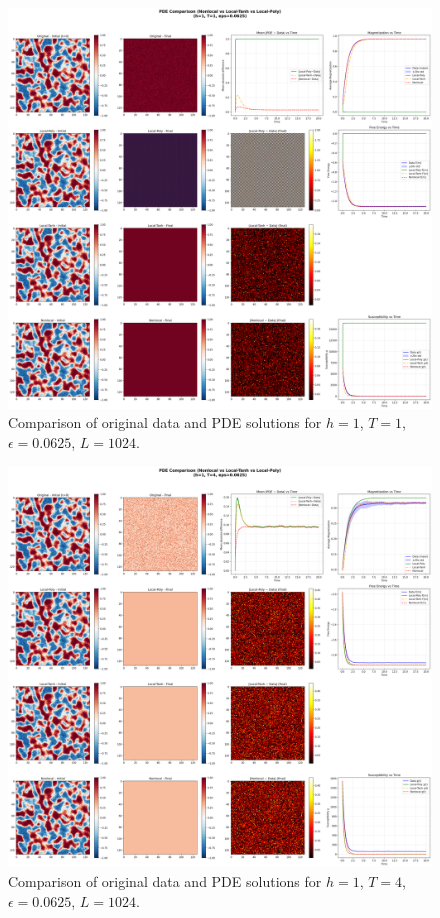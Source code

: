 \documentclass[11pt,a4paper]{article}
\begin{document}
\begin{figure}[!h]
    \centering
    \includegraphics[width=1.0\textwidth]{fig/compare_pde_solvers_L1024_h1_T1_eps0.0625.png}
    \caption{Comparison of original data and PDE solutions for $h=1$, $T=1$, $\epsilon=0.0625$, $L=1024$.}
    \label{fig:pde_comparison_h1_T1_eps0.0625}
\end{figure}

\begin{figure}[!h]
    \centering
    \includegraphics[width=1.0\textwidth]{fig/compare_pde_solvers_L1024_h1_T4_eps0.0625.png}
    \caption{Comparison of original data and PDE solutions for $h=1$, $T=4$, $\epsilon=0.0625$, $L=1024$.}
    \label{fig:pde_comparison_h1_T4_eps0.0625}
\end{figure}
\end{document}
